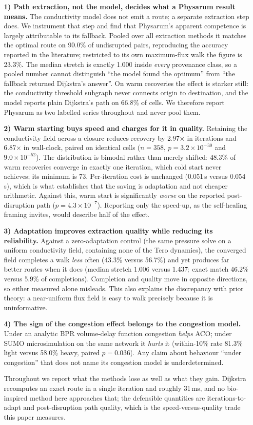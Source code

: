 \textbf{1) Path extraction, not the model, decides what a Physarum result
means.} The conductivity model does not emit a route; a separate extraction
step does. We instrument that step and find that Physarum's apparent
competence is largely attributable to its fallback. Pooled over all
extraction methods it matches the optimal route on 90.0\% of undisrupted
pairs, reproducing the accuracy reported in the literature; restricted to its
own maximum-flux walk the figure is 23.3\%. The median stretch is exactly
1.000 inside \emph{every} provenance class, so a pooled number cannot
distinguish ``the model found the optimum'' from ``the fallback returned
Dijkstra's answer''. On warm recoveries the effect is starker still: the
conductivity threshold subgraph never connects origin to destination, and the
model reports plain Dijkstra's path on 66.8\% of cells. We therefore report
Physarum as two labelled series throughout and never pool them.

\textbf{2) Warm starting buys speed and charges for it in quality.}
Retaining the conductivity field across a closure reduces recovery by
2.97$\times$ in iterations and 6.87$\times$ in wall-clock, paired on
identical cells ($n=358$, $p=3.2\times10^{-59}$ and
$9.0\times10^{-52}$). The distribution is bimodal rather than merely
shifted: 48.3\% of warm recoveries converge in exactly one iteration, which cold start never achieves; its minimum is 73. Per-iteration cost is
unchanged (0.051\,s versus 0.054\,s), which is what establishes that the
saving is adaptation and not cheaper arithmetic. Against this, warm start is
significantly \emph{worse} on the reported post-disruption path
($p=4.3\times10^{-7}$). Reporting only the speed-up, as the self-healing
framing invites, would describe half of the effect.

\textbf{3) Adaptation improves extraction quality while reducing its
reliability.} Against a zero-adaptation control (the same pressure solve on a uniform
conductivity field, containing none of the Tero dynamics), the converged
field completes a walk \emph{less} often (43.3\% versus 56.7\%)
and yet produces far better routes when it does (median stretch 1.006 versus
1.437; exact match 46.2\% versus 5.9\% of completions). Completion and
quality move in opposite directions, so either measured alone misleads. This
also explains the discrepancy with prior theory: a near-uniform flux field is
easy to walk precisely because it is uninformative.

\textbf{4) The sign of the congestion effect belongs to the congestion
model.} Under an analytic BPR volume-delay function congestion \emph{helps}
ACO; under SUMO microsimulation on the same network it \emph{hurts} it
(within-10\% rate 81.3\% light versus 58.0\% heavy, paired $p=0.036$). Any
claim about behaviour ``under congestion'' that does not name its congestion
model is underdetermined.

Throughout we report what the methods lose as well as what they gain.
Dijkstra recomputes an exact route in a single iteration and roughly 31\,ms,
and no bio-inspired method here approaches that; the defensible quantities
are iterations-to-adapt and post-disruption path quality, which is the
speed-versus-quality trade this paper measures.
